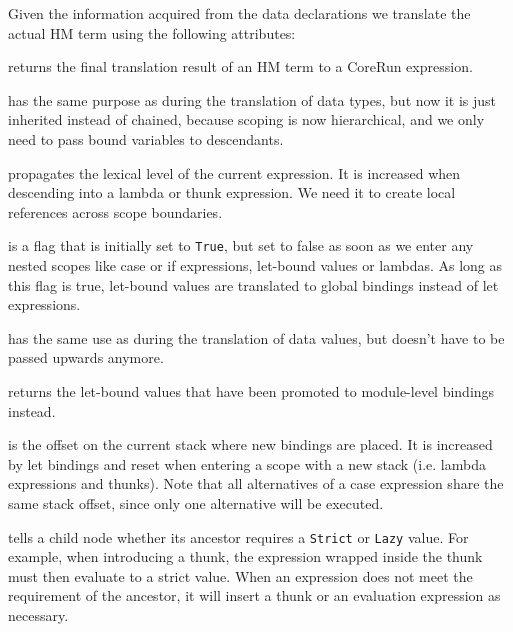 \documentclass{scrartcl}
\newcommand{\attrdesc}[2]{\texttt{#1}, \emph{#2}}
\begin{document}
Given the information acquired from the data declarations we translate the actual HM term using the following attributes:


\begin{description}[style=multiline,leftmargin=4cm,font=\normalfont]

\item[\attrdesc{exp :: CR.Exp}{synthesized}] returns the final translation result of an HM term to a CoreRun expression.

\item[\attrdesc{env :: Environment}{inherited}] has the same purpose as during the translation of data types, but now it is just inherited instead of chained, because scoping is now hierarchical, and we only need to pass bound variables to descendants.

\item[\attrdesc{level :: Int}{inherited}] propagates the lexical level of the current expression. It is increased when descending into a lambda or thunk expression. We need it to create local references across scope boundaries. 

\item[\attrdesc{globalScope :: Bool}{inherited}] is a flag that is initially set to \texttt{True}, but set to false as soon as we enter any nested scopes like case or if expressions, let-bound values or lambdas. As long as this flag is true, let-bound values are translated to global bindings instead of let expressions.

\item[\attrdesc{globalOffset :: Int}{inherited}] has the same use as during the translation of data values, but doesn't have to be passed upwards anymore.

\item[\attrdesc{globalBinds :: GlobalBinds}{synthesized}] returns the let-bound values that have been promoted to module-level bindings instead.

\item[\attrdesc{offset :: Int}{inherited}] is the offset on the current stack where new bindings are placed. It is increased by let bindings and reset when entering a scope with a new stack (i.e. lambda expressions and thunks). Note that all alternatives of a case expression share the same stack offset, since only one alternative will be executed.

\item[\attrdesc{laziness :: Laziness}{inherited}] tells a child node whether its ancestor requires a \texttt{Strict} or \texttt{Lazy} value. For example, when introducing a thunk, the expression wrapped inside the thunk must then evaluate to a strict value.
When an expression does not meet the requirement of the ancestor, it will insert a thunk or an evaluation expression as necessary.


\end{description}
\end{document}
